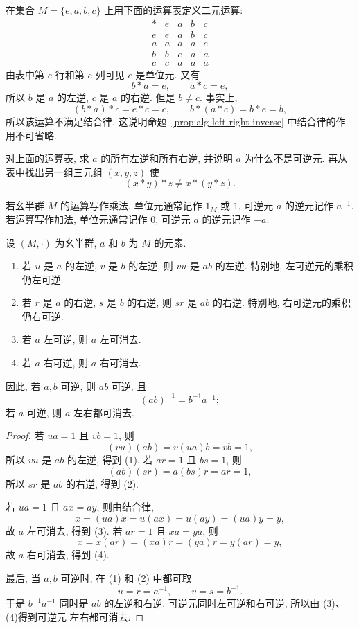 \documentclass[usesamecnt, thmcnt=section, lang=cn, newtx, 10pt, scheme=chinese]{elegantbook}
\begin{document}
\begin{instance}
在集合 $M=\{e,a,b,c\}$ 上用下面的运算表定义二元运算:
\[
\begin{array}{c|cccc}
 *&e&a&b&c\\ \hline
 e&e&a&b&c\\
 a&a&a&a&e\\
 b&b&e&a&a\\
 c&c&a&a&a
\end{array}
\]
由表中第 $e$ 行和第 $e$ 列可见 $e$ 是单位元. 又有
\[
 b*a=e,\qquad a*c=e,
\]
所以 $b$ 是 $a$ 的左逆, $c$ 是 $a$ 的右逆. 但是 $b\neq c$. 事实上,
\[
 (b*a)*c=e*c=c,
 \qquad
 b*(a*c)=b*e=b,
\]
所以该运算不满足结合律. 这说明命题~\ref{prop:alg-left-right-inverse} 中结合律的作用不可省略.
\end{instance}

\begin{exercise}\label{ex:alg-inverse-assoc}
对上面的运算表, 求 $a$ 的所有左逆和所有右逆, 并说明 $a$ 为什么不是可逆元. 再从表中找出另一组三元组 $(x,y,z)$ 使
\[
 (x*y)*z\neq x*(y*z).
\]
\end{exercise}

\begin{notation}
若幺半群 $M$ 的运算写作乘法, 单位元通常记作 $1_M$ 或 $1$, 可逆元 $a$ 的逆元记作 $a^{-1}$. 若运算写作加法, 单位元通常记作 $0$, 可逆元 $a$ 的逆元记作 $-a$.
\end{notation}

\begin{proposition}\label{prop:alg-units-cancel}
设 $(M,\cdot)$ 为幺半群, $a$ 和 $b$ 为 $M$ 的元素.
\begin{enumerate}[label=\rm(\arabic*)]
  \item 若 $u$ 是 $a$ 的左逆, $v$ 是 $b$ 的左逆, 则 $vu$ 是 $ab$ 的左逆. 特别地, 左可逆元的乘积仍左可逆.
  \item 若 $r$ 是 $a$ 的右逆, $s$ 是 $b$ 的右逆, 则 $sr$ 是 $ab$ 的右逆. 特别地, 右可逆元的乘积仍右可逆.
  \item 若 $a$ 左可逆, 则 $a$ 左可消去.
  \item 若 $a$ 右可逆, 则 $a$ 右可消去.
\end{enumerate}
因此, 若 $a,b$ 可逆, 则 $ab$ 可逆, 且
\[
 (ab)^{-1}=b^{-1}a^{-1};
\]
若 $a$ 可逆, 则 $a$ 左右都可消去.
\end{proposition}

\begin{proof}
若 $ua=1$ 且 $vb=1$, 则
\[
 (vu)(ab)=v(ua)b=vb=1,
\]
所以 $vu$ 是 $ab$ 的左逆, 得到 (1). 若 $ar=1$ 且 $bs=1$, 则
\[
 (ab)(sr)=a(bs)r=ar=1,
\]
所以 $sr$ 是 $ab$ 的右逆, 得到 (2).

若 $ua=1$ 且 $ax=ay$, 则由结合律,
\[
 x=(ua)x=u(ax)=u(ay)=(ua)y=y,
\]
故 $a$ 左可消去, 得到 (3). 若 $ar=1$ 且 $xa=ya$, 则
\[
 x=x(ar)=(xa)r=(ya)r=y(ar)=y,
\]
故 $a$ 右可消去, 得到 (4).

最后, 当 $a,b$ 可逆时, 在 (1) 和 (2) 中都可取
\[
 u=r=a^{-1},\qquad v=s=b^{-1}.
\]
于是 $b^{-1}a^{-1}$ 同时是 $ab$ 的左逆和右逆. 可逆元同时左可逆和右可逆, 所以由 (3)、(4)得到可逆元 左右都可消去.
\end{proof}
\end{document}
